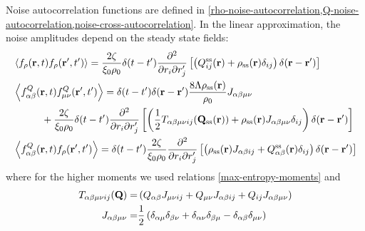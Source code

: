 \documentclass[a5paper]{article}
\begin{document}

Noise autocorrelation functions are defined in \cref{rho-noise-autocorrelation,Q-noise-autocorrelation,noise-cross-autocorrelation}. In the linear approximation, the noise amplitudes depend on the steady state fields:
\begin{subequations}
    \label{noise-autocorrelation-2}
\begin{align}
    &\left\langle f_\rho(\mathbf{r}, t) f_\rho(\mathbf{r}', t') \right\rangle = \frac{2\zeta}{\xi_0\rho_0} \delta(t-t')\frac{\partial^2}{\partial r_i \partial r'_j}\left[\left(Q^{\mathrm{ss}}_{ij}(\mathbf{r}) + \rho_{\mathrm{ss}}(\mathbf{r})\delta_{ij}\right)\delta(\mathbf{r}-\mathbf{r}')\right] 
    \\
    &\left\langle f^Q_{\alpha\beta}(\mathbf{r}, t) f^Q_{\mu\nu}(\mathbf{r}', t') \right\rangle = 
    \delta(t-t') \delta(\mathbf{r}-\mathbf{r}') \frac{8\Lambda \rho_{\mathrm{ss}}(\mathbf{r}) }{\rho_0} J_{{\alpha\beta}{\mu\nu}}
    \\
    &\hspace{1cm}+\frac{2\zeta}{\xi_0\rho_0} \delta(t-t')\frac{\partial^2}{\partial r_i \partial r'_j}\left[\left(
        \frac{1}{2} T_{{\alpha\beta}{\mu\nu} ij}(\mathbf{Q}_{\mathrm{ss}}(\mathbf{r}))
        +\rho_{\mathrm{ss}}(\mathbf{r}) J_{{\alpha\beta}{\mu\nu}} \delta_{ij}
    \right)\delta(\mathbf{r}-\mathbf{r}')
    \right]
    \\
    &\left\langle f^Q_{\alpha\beta}(\mathbf{r}, t) f_\rho(\mathbf{r}', t') \right\rangle = \delta(t-t')\frac{2\zeta}{\xi_0\rho_0} \frac{\partial^2}{\partial r_i \partial r'_j}\left[
        \left(\rho_{\mathrm{ss}}(\mathbf{r}) J_{{\alpha\beta} ij} + Q^{\mathrm{ss}}_{\alpha\beta}(\mathbf{r}) \delta_{ij}\right)
        \delta(\mathbf{r}-\mathbf{r}')
    \right]
\end{align}
\end{subequations}
where for the higher moments we used relations \eqref{max-entropy-moments} and 
\begin{align}
    T_{{\alpha\beta\mu\nu} ij}(\mathbf{Q})=&\left(Q_{\alpha\beta}J_{\mu\nu ij} + Q_{\mu\nu}J_{\alpha\beta ij} + Q_{ij}J_{\alpha\beta\mu\nu}\right)
    \\
    J_{{\alpha\beta\mu\nu}} =& \frac{1}{2}\left(\delta_{\alpha\mu}\delta_{\beta\nu} + \delta_{\alpha\nu}\delta_{\beta\mu} - \delta_{\alpha\beta}\delta_{\mu\nu}\right)
\end{align}
\end{document}
